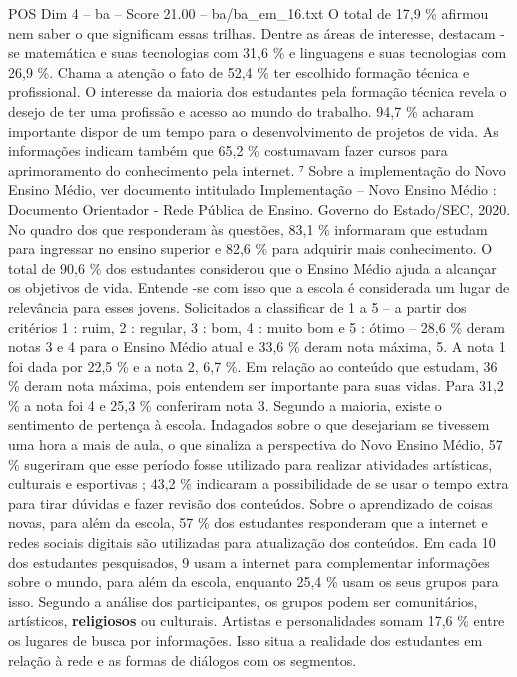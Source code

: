 \begin{textsample}{POS Dim 4 – ba – Score 21.00 – ba/ba\_em\_16.txt}
O total de 17,9 \% afirmou nem saber o que significam essas trilhas.
Dentre as áreas de interesse, destacam -se matemática e suas tecnologias com 31,6 \% e linguagens e suas tecnologias com 26,9 \%.
Chama a atenção o fato de 52,4 \% ter escolhido formação técnica e profissional.
O interesse da maioria dos estudantes pela formação técnica revela o desejo de ter uma profissão e acesso ao mundo do trabalho. 94,7 \% acharam importante dispor de um tempo para o desenvolvimento de projetos de vida.
As informações indicam também que 65,2 \% costumavam fazer cursos para aprimoramento do conhecimento pela internet. ⁷ Sobre a implementação do Novo Ensino Médio, ver documento intitulado Implementação – Novo Ensino Médio : Documento Orientador - Rede Pública de Ensino.
Governo do Estado/SEC, 2020.
No quadro dos que responderam às questões, 83,1 \% informaram que estudam para ingressar no ensino superior e 82,6 \% para adquirir mais conhecimento.
O total de 90,6 \% dos estudantes considerou que o Ensino Médio ajuda a alcançar os objetivos de vida.
Entende -se com isso que a escola é considerada um lugar de relevância para esses jovens.
Solicitados a classificar de 1 a 5 – a partir dos critérios 1 : ruim, 2 : regular, 3 : bom, 4 : muito bom e 5 : ótimo – 28,6 \% deram notas 3 e 4 para o Ensino Médio atual e 33,6 \% deram nota máxima, 5.
A nota 1 foi dada por 22,5 \% e a nota 2, 6,7 \%.
Em relação ao conteúdo que estudam, 36 \% deram nota máxima, pois entendem ser importante para suas vidas.
Para 31,2 \% a nota foi 4 e 25,3 \% conferiram nota 3.
Segundo a maioria, existe o sentimento de pertença à escola.
Indagados sobre o que desejariam se tivessem uma hora a mais de aula, o que sinaliza a perspectiva do Novo Ensino Médio, 57 \% sugeriram que esse período fosse utilizado para realizar atividades artísticas, culturais e esportivas ; 43,2 \% indicaram a possibilidade de se usar o tempo extra para tirar dúvidas e fazer revisão dos conteúdos.
Sobre o aprendizado de coisas novas, para além da escola, 57 \% dos estudantes responderam que a internet e redes sociais digitais são utilizadas para atualização dos conteúdos.
Em cada 10 dos estudantes pesquisados, 9 usam a internet para complementar informações sobre o mundo, para além da escola, enquanto 25,4 \% usam os seus grupos para isso.
Segundo a análise dos participantes, os grupos podem ser comunitários, artísticos, \textbf{religiosos} ou culturais.
Artistas e personalidades somam 17,6 \% entre os lugares de busca por informações.
Isso situa a realidade dos estudantes em relação à rede e as formas de diálogos com os segmentos.

\end{textsample}
